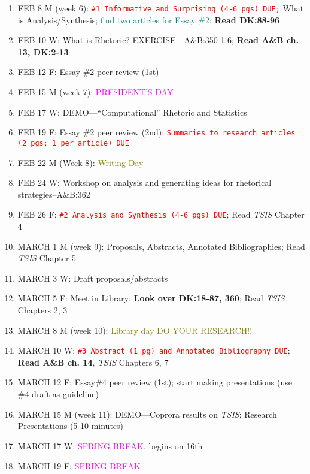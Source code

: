 \begin{enumerate}
\item FEB 8 M (week 6): \textcolor{red}{\texttt{\#1 Informative and Surprising (4-6 pgs) DUE;}} What is Analysis/Synthesis; \textcolor{teal}{{\sc find two articles for Essay \#2}}; \textbf{Read DK:88-96} 
\item[] FEB 10 W: What is Rhetoric? EXERCISE---A\&B:350 1-6; {\bf Read A\&B ch. 13, DK:2-13}
\item[] FEB 12 F: Essay \#2 peer review (1st) 

\item FEB 15 M (week 7): \textcolor{magenta}{PRESIDENT'S DAY}
\item[] FEB 17 W: DEMO---``Computational'' Rhetoric and Statistics
\item[] FEB 19 F: Essay \#2 peer review (2nd); \textcolor{red}{\texttt{Summaries to research articles (2 pgs; 1 per article) DUE}}

\item FEB 22 M (Week 8): \textcolor{olive}{Writing Day}
\item[] FEB 24 W: Workshop on analysis and generating ideas for rhetorical strategies--A\&B:362
\item[]  FEB 26 F: \textcolor{red}{\texttt{\#2 Analysis and Synthesis (4-6 pgs) DUE}}; Read \textsl{TSIS} Chapter 4

\item MARCH 1 M (week 9): Proposals, Abstracts, Annotated Bibliographies; Read {\sl TSIS} Chapter 5
\item[] MARCH 3 W: Draft proposals/abstracts
\item[] MARCH 5 F: Meet in Library; {\bf Look over DK:18-87, 360}; Read {\sl TSIS} Chapters 2, 3

\item MARCH 8 M (week 10): \textcolor{olive}{Library day DO YOUR RESEARCH!!}
\item[] MARCH 10 W: \textcolor{red}{\texttt{\#3 Abstract (1 pg) and Annotated Bibliography DUE}}; {\bf Read A\&B ch. 14}, {\sl TSIS} Chapters 6, 7
\item[] MARCH 12 F: Essay\#4 peer review (1st); start making presentations (use \#4 draft as guideline)

\item MARCH 15 M (week 11): DEMO---Coprora results on {\sl TSIS}; Research Presentations (5-10 minutes) 
\item[] MARCH 17 W: \textcolor{magenta}{SPRING BREAK}, begins on 16th
\item[] MARCH 19 F: \textcolor{magenta}{SPRING BREAK}


\end{enumerate}

